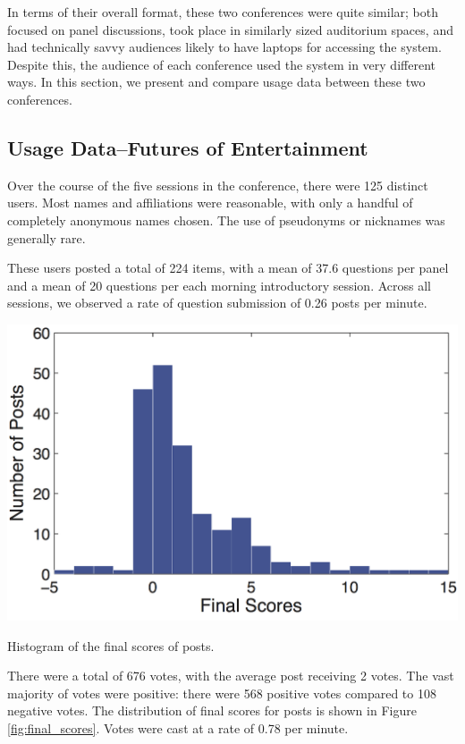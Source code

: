 In terms of their overall format, these two conferences were quite similar; both focused on panel discussions, took place in similarly sized auditorium spaces, and had technically savvy audiences likely to have laptops for accessing the system. Despite this, the audience of each conference used the system in very different ways. In this section, we present and compare usage data between these two conferences.

\subsection{Usage Data--Futures of Entertainment}
Over the course of the five sessions in the conference, there were 125 distinct users. Most names and affiliations were reasonable, with only a handful of completely anonymous names chosen. The use of pseudonyms or nicknames was generally rare. 

These users posted a total of 224 items, with a mean of 37.6 questions per panel and a mean of 20 questions per each morning introductory session. Across all sessions, we observed a rate of question submission of 0.26 posts per minute.

\begin{marginfigure}
	\includegraphics{figures/backchannl/final_scores.png}
	\caption{Histogram of the final scores of posts.}
	\label{fig:final_scores}
\end{marginfigure}

There were a total of 676 votes, with the average post receiving 2 votes. The vast majority of votes were positive: there were 568 positive votes compared to 108 negative votes. The distribution of final scores for posts is shown in Figure \ref{fig:final_scores}. Votes were cast at a rate of 0.78 per minute.



